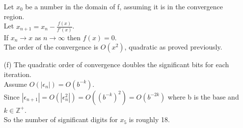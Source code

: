 \documentclass[10pt,twoside,a4paper]{article}
\begin{document}
\begin{itemize}
Let $x_0$ be a number in the domain of f, assuming it is in the convergence region.
\\Let $x_{n+1}=x_n-\frac{f(x)}{f'(x)}$.
\\If $x_n \to x$ as $n \to \infty$ then $f(x)=0$.
\\The order of the convergence is $O(x^2)$, quadratic as proved previously.
\item[(f)]
The quadratic order of convergence doubles the significant bits for each iteration.
\\Assume $O(|\epsilon_n|)=O(b^{-k})$.
\\Since $|\epsilon_{n+1}|=O(|\epsilon_n^2|)=O((b^{-k})^2)=O(b^{-2k})$ where b is the base and $k\in \mathbb{Z}^+$.
\\So the number of significant digits for $x_5$ is roughly 18.
\end{itemize}
\end{document}
